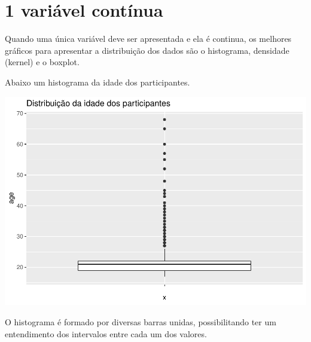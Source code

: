 \documentclass[
]{book}
\newenvironment{Shaded}{\begin{snugshade}}{\end{snugshade}}
\newcommand{\DataTypeTok}[1]{\textcolor[rgb]{0.13,0.29,0.53}{#1}}
\newcommand{\DecValTok}[1]{\textcolor[rgb]{0.00,0.00,0.81}{#1}}
\newcommand{\KeywordTok}[1]{\textcolor[rgb]{0.13,0.29,0.53}{\textbf{#1}}}
\newcommand{\NormalTok}[1]{#1}
\newcommand{\OperatorTok}[1]{\textcolor[rgb]{0.81,0.36,0.00}{\textbf{#1}}}
\newcommand{\StringTok}[1]{\textcolor[rgb]{0.31,0.60,0.02}{#1}}
\begin{document}
\hypertarget{variuxe1vel-contuxednua}{%
\section{1 variável contínua}\label{variuxe1vel-contuxednua}}

Quando uma única variável deve ser apresentada e ela é continua, os melhores gráficos para apresentar a distribuição dos dados são o histograma, densidade (kernel) e o boxplot.

Abaixo um histograma da idade dos participantes.

\begin{Shaded}
\end{Shaded}

\begin{center}\includegraphics{gitbook-demo_files/figure-latex/unnamed-chunk-18-1} \end{center}

O histograma é formado por diversas barras unidas, possibilitando ter um entendimento dos intervalos entre cada um dos valores.
\end{document}

